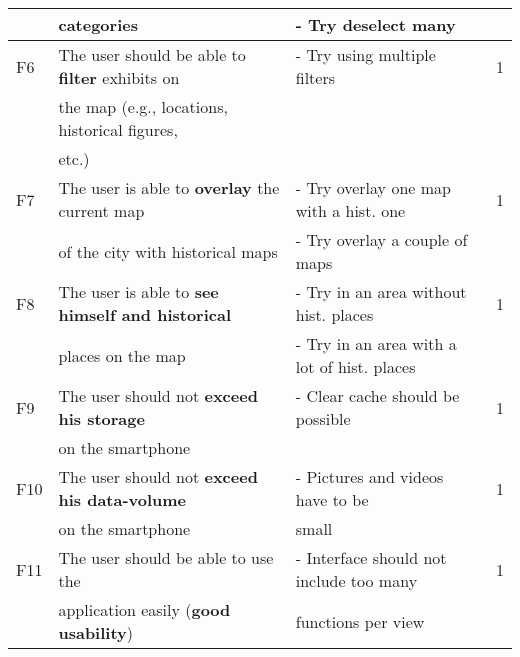 \documentclass[twoside,openright,fleqn,pointlessnumbers,headinclude,,11pt,a4paper,BCOR5mm,footinclude,cleardoubleempty,abstracton %
                ]{scrreprt}
\begin{document}
\begin{table}[h]
\begin{tabular}{llll}
		& categories 									& - Try deselect many	& \\
	\hline
	F6 & The user should be able to \textbf{filter} exhibits on  	& - Try using multiple filters  	& 1\\
		& the map (e.g., locations, historical figures, 			&	& \\
		& etc.)										&	& \\
	\hline
	F7 & The user is able to \textbf{overlay} the current map  	& - Try overlay one map with a hist. one & 1\\
		& of the city with historical maps					& - Try overlay a couple of maps	& \\
	\hline
	F8 & The user is able to \textbf{see himself and historical} 	& - Try in an area without hist. places  	& 1\\
		& places on the map 							& - Try in an area with a lot of hist. places	&  \\
	\hline
	F9 & The user should not \textbf{exceed his storage} 		& - Clear cache should be possible  	& 1\\
		& on the smartphone							&	& \\
	\hline
	F10 & The user should not \textbf{exceed his data-volume} 	& - Pictures and videos have to be   	& 1\\
		& on the smartphone							& small	& \\
	\hline
	F11 & The user should be able to use the  				&  - Interface should not include too many 	& 1\\
		& application easily (\textbf{good usability})			& functions per view 	& \\
			\hline
	\end{tabular}
	\label{RequirementsFrontend}
	\end{table}
\end{document}
